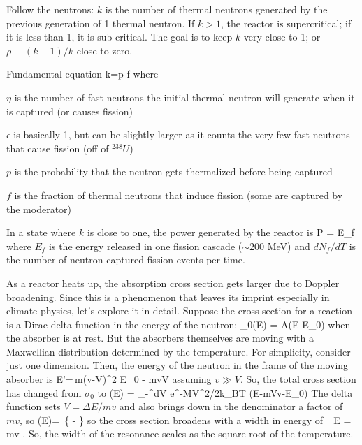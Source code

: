\documentclass[11pt]{book}
\begin{document}

Follow the neutrons: $k$ is the number of thermal neutrons generated by the previous generation of 1 thermal neutron. If $k>1$, the reactor is supercritical; if it is less than 1, it is sub-critical. The goal is to keep $k$ very close to 1; or $\rho\equiv (k-1)/k$ close to zero.

Fundamental equation
\be
k=\eta\epsilon p f
\ee
where
\bei
\item $\eta$ is the number of fast neutrons the initial thermal neutron will generate when it is captured (or causes fission)
\item $\epsilon$ is basically 1, but can be slightly larger as it counts the very few fast neutrons that cause fission (off of $^{238}U$)
\item $p$ is the probability that the neutron gets thermalized before being captured 
\item $f$ is the fraction of thermal neutrons that induce fission (some are captured by the moderator)
\eei

In a state where $k$ is close to one, the power generated by the reactor is
\be
P = E_f 
\ee
where $E_f$ is the energy released in one fission cascade ($\sim200$ MeV) and $dN_f/dT$ is the number of neutron-captured fission events per time. 


As a reactor heats up, the absorption cross section gets larger due to Doppler broadening. Since this is a phenomenon that leaves its imprint especially in climate physics, let's explore it in detail. Suppose the cross section for a reaction is a Dirac delta function in the energy of the neutron:
\be
\sigma_0(E) = A\delta(E-E_0)
\ee
when the absorber is at rest. But the absorbers themselves are moving with a Maxwellian distribution determined by the temperature. For simplicity, consider just one dimension. Then, the energy of the neutron in the frame of the moving absorber is 
\be
E'=\,m(v-V)^2 \simeq E_0 - mvV
\ee
assuming $v\gg V$. So, the total cross section has changed from
$\sigma_0 $
to
\be
\sigma(E) =  \int_{-\infty}^\infty dV e^{-MV^2/2k_BT} \delta(E-mVv-E_0)
\ee
The delta function sets $V=\Delta E/mv$ and also brings down in the denominator a factor of $mv$, so
\be
\sigma(E)=  \,\exp\left\{ - \right\}
\ee
so the cross section broadens with a width in energy of \be
\sigma_E = mv .\ee
So, the width of the resonance scales as the square root of the temperature.
\end{document}
